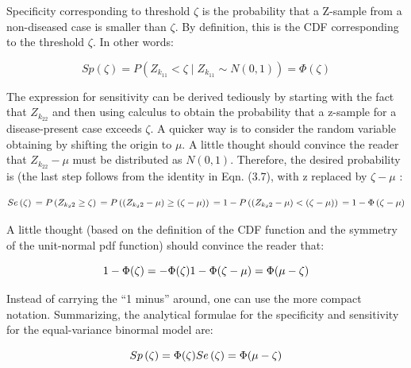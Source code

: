 \documentclass[
]{book}
\begin{document}
Specificity corresponding to threshold \(\zeta\) is the probability that a Z-sample from a non-diseased case is smaller than \(\zeta\). By definition, this is the CDF corresponding to the threshold \(\zeta\). In other words:

\begin{equation} 
Sp\left ( \zeta \right )=P\left ( Z_{k_11} < \zeta\mid Z_{k_11} \sim N\left ( 0,1 \right )\right ) = \Phi\left ( \zeta \right )
\label{eq:binaryTask-Specificity}
\end{equation}

The expression for sensitivity can be derived tediously by starting with the fact that \(Z_{k_22}\) and then using calculus to obtain the probability that a z-sample for a disease-present case exceeds \(\zeta\). A quicker way is to consider the random variable obtaining by shifting the origin to \(\mu\). A little thought should convince the reader that \(Z_{k_22}-\mu\) must be distributed as \(N(0,1)\). Therefore, the desired probability is (the last step follows from the identity in Eqn. (3.7), with z replaced by \(\zeta-\mu\) :

\begin{equation} 
Se\left ( \zeta \right )\\
=P\left ( Z_{k_22} \geq \zeta\right ) \\
=P\left (\left ( Z_{k_22} -\mu  \right ) \geq\left ( \zeta -\mu  \right )\right ) \\
=1-P\left (\left ( Z_{k_22} -\mu  \right ) < \left ( \zeta -\mu  \right )\right ) \\
= 1-\Phi\left ( \zeta -\mu \right )
\label{eq:binaryTask-Sensitivity1}
\end{equation}

A little thought (based on the definition of the CDF function and the symmetry of the unit-normal pdf function) should convince the reader that:

\begin{equation} 
1-\Phi(\zeta)=-\Phi(\zeta)\\
1-\Phi(\zeta-\mu)=\Phi(\mu-\zeta)
\label{eq:binaryTask-Sensitivity2}
\end{equation}

Instead of carrying the ``1 minus'' around, one can use the more compact notation. Summarizing, the analytical formulae for the specificity and sensitivity for the equal-variance binormal model are:

\begin{equation} 
Sp\left ( \zeta \right ) = \Phi(\zeta)\\
Se\left ( \zeta \right ) = \Phi(\mu-\zeta)
\label{eq:binaryTask-Sensitivity-Specificity}
\end{equation}
\end{document}
